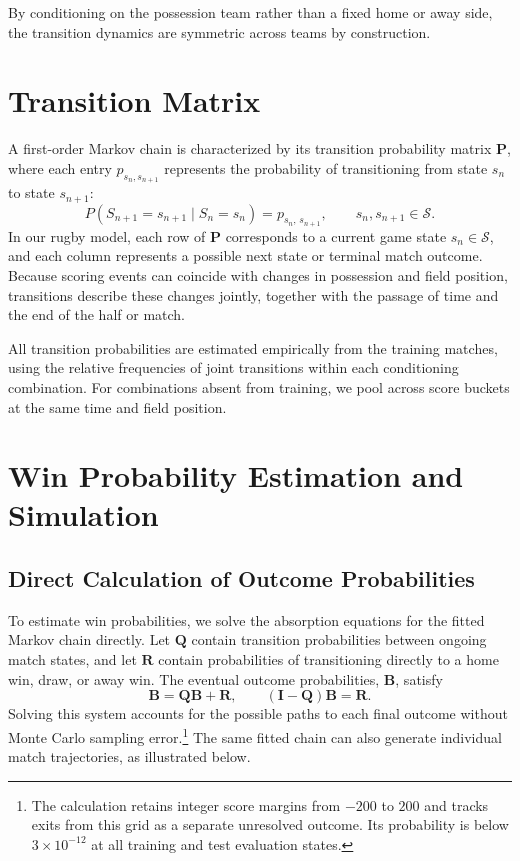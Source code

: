 \documentclass[12pt]{article}
\begin{document}
By conditioning on the possession team rather than a fixed home or away side, the transition dynamics are symmetric across teams by construction.

\section{Transition Matrix}

A first-order Markov chain is characterized by its transition probability matrix $\mathbf{P}$, where each entry $p_{s_n, s_{n+1}}$ represents the probability of transitioning from state $s_n$ to state $s_{n+1}$:
\[
  P(S_{n+1} = s_{n+1} \mid S_n = s_n) = p_{s_n,\, s_{n+1}}, \qquad s_n, s_{n+1} \in \mathcal{S}.
\]
In our rugby model, each row of $\mathbf{P}$ corresponds to a current game state $s_n\in\mathcal{S}$, and each column represents a possible next state or terminal match outcome.
Because scoring events can coincide with changes in possession and field position, transitions describe these changes jointly, together with the passage of time and the end of the half or match.

All transition probabilities are estimated empirically from the training matches, using the relative frequencies of joint transitions within each conditioning combination.
For combinations absent from training, we pool across score buckets at the same time and field position.

\section{Win Probability Estimation and Simulation}

\subsection{Direct Calculation of Outcome Probabilities}

To estimate win probabilities, we solve the absorption equations for the fitted Markov chain directly.
Let $\mathbf Q$ contain transition probabilities between ongoing match states, and let $\mathbf R$ contain probabilities of transitioning directly to a home win, draw, or away win.
The eventual outcome probabilities, $\mathbf B$, satisfy
\begin{equation}
\mathbf B=\mathbf Q\mathbf B+\mathbf R,
\qquad (\mathbf I-\mathbf Q)\mathbf B=\mathbf R.
\end{equation}
Solving this system accounts for the possible paths to each final outcome without Monte Carlo sampling error.\footnote{The calculation retains integer score margins from $-200$ to $200$ and tracks exits from this grid as a separate unresolved outcome. Its probability is below $3\times10^{-12}$ at all training and test evaluation states.}
The same fitted chain can also generate individual match trajectories, as illustrated below.
\end{document}
